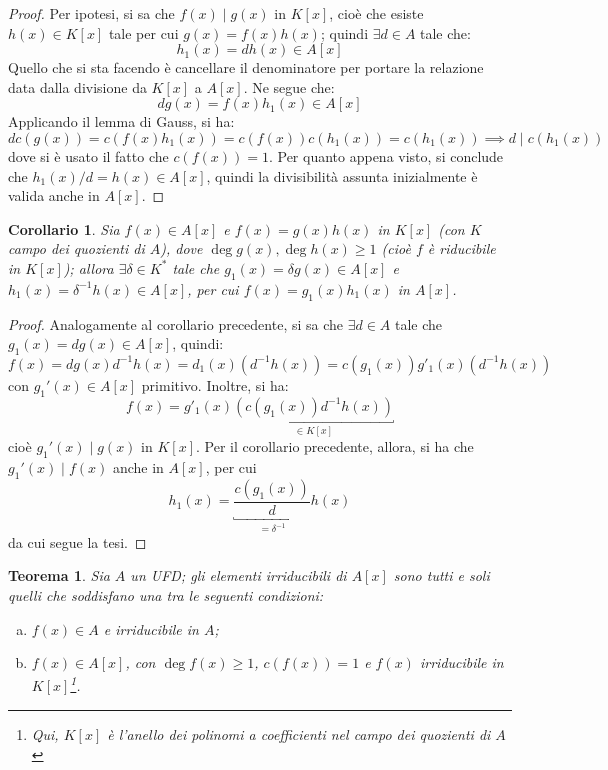 \documentclass[11pt]{article}
\theoremstyle{style}
\newtheorem{teorema}{Teorema}[section]
\newtheorem{corollario}{Corollario}[teorema]
\numberwithin{equation}{subsection}
\begin{document}
	\begin{proof}
		Per ipotesi, si sa che $f(x)  \mid g(x)$ in $K[x]$, cio\`e che esiste $h(x) \in K[x]$ tale per cui $g(x) = f(x) h(x)$; quindi $\exists d \in A$ tale che:
		\[
			h_1(x) = dh(x) \in A[x]
		\] 
		Quello che si sta facendo \`e cancellare il denominatore per portare la relazione data dalla divisione da $K[x]$ a $A[x]$.
		Ne segue che:
		\[
			dg(x) = f(x) h_1(x) \in A[x]
		\] 
		Applicando il lemma di Gauss, si ha:
		\[
		dc(g(x)) = c(f(x)h_1(x)) = c(f(x)) c(h_1(x)) = c(h_1(x)) \implies d  \mid c(h_1(x))
		\] 
		dove si \`e usato il fatto che $c(f(x)) = 1$. 
		Per quanto appena visto, si conclude che $h_1(x) / d = h(x) \in A[x]$, quindi la divisibilit\`a assunta inizialmente \`e valida anche in $A[x]$.
	\end{proof}
\begin{corollario}\label{corufd2}
	Sia $f(x) \in A[x]$ e $f(x) = g(x) h(x) $ in $K[x]$ (con $K$ campo dei quozienti di $A$), dove $\operatorname{deg} g(x) , \operatorname{deg} h(x) \ge 1$ (cio\`e $f$ \`e riducibile in $K[x]$); allora $\exists \delta \in K^*$ tale che $g_1(x) = \delta g(x) \in A[x]$ e $h_1(x) = \delta ^{-1}h(x)\in A[x]$, per cui $f(x) = g_1(x) h_1(x)$ in $A[x]$.
\end{corollario}
	\begin{proof}
		Analogamente al corollario precedente, si sa che $\exists d \in A$ tale che $g_1(x) = dg(x) \in A[x]$, quindi:
		\[
		f(x) = dg(x) d^{-1}h(x) = d_1(x) \left(d^{-1} h(x)\right) = c(g_1(x)) g'_1(x) (d^{-1}h(x))
		\] 
		con $g_1'(x) \in A[x] $ primitivo.
		Inoltre, si ha:
		\[
			f(x) = g'_1(x) \underbracket{\left(c(g_1(x)) d^{-1}h(x)\right) }_{\in K[x]} 
		\] 
		cio\`e $g_1'(x)  \mid g(x)$ in $K[x]$.
		Per il corollario precedente, allora, si ha che $g_1'(x)  \mid f(x)$ anche in $A[x]$, per cui 
		\[
			h_1(x) = \underbracket{\frac{c(g_1(x))}{d}}_{=\delta ^{-1}} h(x)
		\] 
		 da cui segue la tesi.
	\end{proof}
\begin{teorema}
	Sia $A$ un UFD; gli elementi irriducibili di $A[x]$ sono tutti e soli quelli che soddisfano una tra le seguenti condizioni:
	\begin{enumerate}[(a).]
		\item $f(x) \in A$ e irriducibile in $A$;
		\item $f(x) \in A[x]$, con $\operatorname{deg} f(x) \ge 1$, $c(f(x)) = 1$ e $f(x)$ irriducibile in $K[x]$\footnote{Qui, $K[x]$ \`e l'anello dei polinomi a coefficienti nel campo dei quozienti di $A$}.
	\end{enumerate}
\end{teorema}
\end{document}
